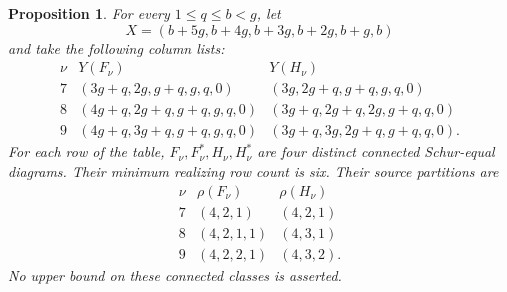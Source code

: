 \documentclass[11pt,a4paper]{amsart}
\numberwithin{equation}{section}
\theoremstyle{plain}
\newtheorem{proposition}[theorem]{Proposition}
\theoremstyle{definition}
\begin{document}
\begin{proposition}\label{prop:six-row-quartets}
For every \(1\le q\le b<g\), let
\begin{equation}\label{eq:six-row-list}
 X=(b+5g,b+4g,b+3g,b+2g,b+g,b)
\end{equation}
and take the following column lists:
\begin{equation}\label{eq:six-column-lists}
 \begin{array}{c|l|l}
 \nu&Y(F_\nu)&Y(H_\nu)\\ \hline
 7&(3g+q,2g,g+q,g,q,0)&(3g,2g+q,g+q,g,q,0)\\
 8&(4g+q,2g+q,g+q,g,q,0)&(3g+q,2g+q,2g,g+q,q,0)\\
 9&(4g+q,3g+q,g+q,g,q,0)&(3g+q,3g,2g+q,g+q,q,0).
 \end{array}
\end{equation}
For each row of the table, \(F_\nu,F_\nu^*,H_\nu,H_\nu^*\) are four distinct connected Schur-equal diagrams.  Their minimum realizing row count is six.  Their source partitions are
\begin{equation}\label{eq:six-patterns}
 \begin{array}{c|c|c}
 \nu&\rho(F_\nu)&\rho(H_\nu)\\ \hline
 7&(4,2,1)&(4,2,1)\\
 8&(4,2,1,1)&(4,3,1)\\
 9&(4,2,2,1)&(4,3,2).
 \end{array}
\end{equation}
No upper bound on these connected classes is asserted.
\end{proposition}
\end{document}
